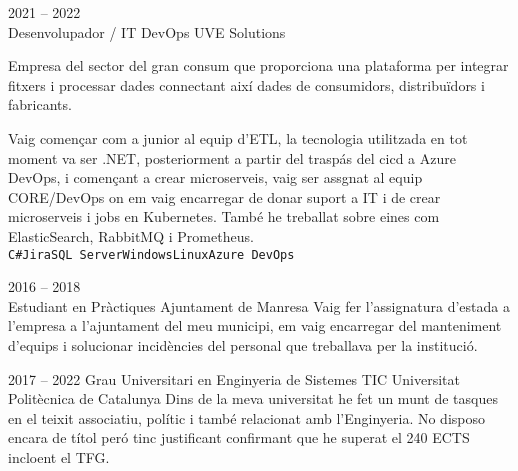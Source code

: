 \documentclass[9pt]{developercv} %
\begin{document}
\begin{entrylist}
	\entry
		{2021 -- 2022\\}
		{Desenvolupador / IT DevOps}
		{UVE Solutions}
		{Empresa del sector del gran consum que proporciona una plataforma per integrar fitxers i
		processar dades connectant així dades de consumidors, distribuïdors i fabricants.

		Vaig començar com a junior al equip d’ETL, la tecnologia utilitzada en tot moment va ser .NET, posteriorment a partir del traspás del cicd a Azure DevOps, i començant a crear microserveis, vaig ser
		assgnat al equip CORE/DevOps on em vaig encarregar de donar suport a IT i de crear microserveis
		i jobs en Kubernetes.
		També he treballat sobre eines com ElasticSearch, RabbitMQ i Prometheus.
		\\ \texttt{C\#}\slashsep\texttt{Jira}\slashsep\texttt{SQL Server}\slashsep\texttt{Windows}\slashsep\texttt{Linux}\slashsep\texttt{Azure DevOps}}

	\entry
		{2016 -- 2018\\}
		{Estudiant en Pràctiques}
		{Ajuntament de Manresa}
		{ 
			Vaig fer l'assignatura d'estada a l'empresa a l'ajuntament del meu municipi, em vaig encarregar del manteniment d'equips i solucionar incidències del personal que treballava per la institució. 
			}

\end{entrylist}



\begin{entrylist}
	\entry
		{2017 -- 2022}
		{Grau Universitari en Enginyeria de Sistemes TIC}
		{Universitat Politècnica de Catalunya}
		{Dins de la meva universitat he fet un munt de tasques en el teixit associatiu, polític i també
relacionat amb l’Enginyeria. No disposo encara de títol peró tinc justificant confirmant que he superat el 240 ECTS incloent el TFG.}
\end{entrylist}

\end{document}
